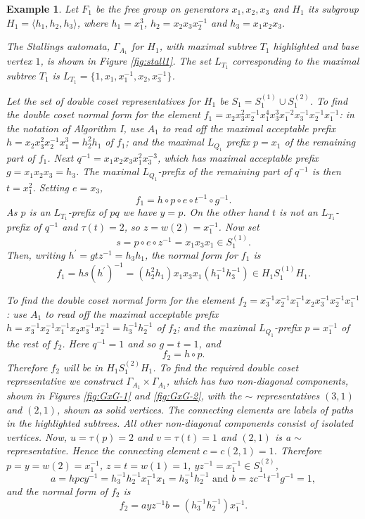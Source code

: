 \documentclass[a4paper,12pt]{article}
\newcommand{\G}{\Gamma }
\renewcommand{\t}{\tau }
\newtheorem{exam}[theorem]{Example}
\newenvironment{example}{\begin{exam} \rm}{\end{exam}}
\numberwithin{equation}{section}
\numberwithin{figure}{section}
\newcommand{\la}{\langle}
\newcommand{\ra}{\rangle}
\begin{document}
\begin{example}\label{ex:f_1}
Let $F_1$ be the free group on generators $x_1,x_2,x_3$ and $H_1$ its
subgroup $H_1=\la
h_1,h_2,h_3\ra$, where  $h_1= x_1^3$, $h_2=x_2x_3x_2^{-1}$ and
$h_3=x_1x_2x_3$.

The Stallings automata, $\G_{A_1}$ for $H_1$,
with maximal subtree $T_1$ highlighted and base vertex $1$, is shown
in Figure %
 \ref{fig:stall1}.
The set $L_{T_1}$ corresponding to the maximal subtree  $T_1$ is
 $L_{T_1}=\{1,x_1,x_1^{-1},x_2,x_3^{-1} \}$.

Let the set of double coset representatives for $H_1$ be $S_1=S_1^{(1)}
\cup S_1^{(2)}$.
To find the double coset normal form for the element $f_1 =
x_2x_3^2x_2^{-1} x_1^4x_3^3x_1^{-2}x_3^{-1}x_2^{-1}x_1^{-1}$: in
the notation of Algorithm I, use
${A_1}$ to read off the maximal acceptable prefix $h=x_2x_3^2x_2^{-1} x_1^3
=h_2^2h_1$
of $f_1$; and
the maximal $L_{Q_1}$ prefix $p=x_1$ of the remaining part of $f_1$. Next
$q^{-1}=x_1x_2x_3x_1^2x_3^{-3}$, which has maximal acceptable prefix
$g=x_1x_2x_3=h_3$. The maximal $L_{Q_1}$-prefix of the remaining part of $q^{-1}$
is then $t=x_1^2$. Setting $e=x_3$,
\[f_1=h\circ p\circ e\circ t^{-1}\circ g^{-1}.\]
As $p$ is an $L_{T_1}$-prefix of $pq$ we have $y=p$. On the other hand
$t$ is not an $L_{T_1}$-prefix of $q^{-1}$ and $\t(t)=2$, so $z=w(2)=x_1^{-1}$.
Now set
\[s=p\circ e\circ z^{-1}=x_1x_3x_1\in S_1^{(1)}.\]
Then, writing $h^\prime=gtz^{-1}=h_3h_1$, the normal form for $f_1$ is
\[f_1=hs(h^\prime)^{-1}=(h_2^{2}h_1) x_1x_3x_1(h_1^{-1}h_3^{-1})\in H_1S_1^{(1)}H_1.\]

To find the double coset normal form for the element
$f_2=x_3^{-1}x_2^{-1}x_1^{-1}x_2x_3^{-1}x_2^{-1}x_1^{-1}$: use
${A_1}$ to read off the maximal acceptable prefix
$h=x_3^{-1}x_2^{-1}x_1^{-1}x_2x_3^{-1}x_2^{-1}=h_3^{-1}h_2^{-1}$
of $f_2$;
and  the
maximal $L_{Q_1}$-prefix $p=x_1^{-1}$ of the rest of $f_2$.  Here
$q^{-1}=1$ and so $g=t=1$, and
\[f_2=h\circ p.\]
Therefore $f_2$ will be in $H_1S_1^{(2)}H_1$. To find the required
double coset representative we construct $\G_{A_1}\times
\G_{A_1}$, which has two non-diagonal components, shown in Figures
\ref{fig:GxG-1} and \ref{fig:GxG-2},
with the $\sim$ representatives $(3,1)$ and $(2,1)$,  shown as
solid vertices. The connecting elements are labels of paths in the
highlighted subtrees.  All other non-diagonal components consist
of isolated vertices. Now, $u=\t(p)=2$ and $v=\t(t)=1$ and $(2,1)$
is a $\sim$ representative. Hence the  connecting element
$c=c(2,1)=1$. Therefore $p=y=w(2)=x_1^{-1}$, $z=t=w(1)=1$,
$yz^{-1}=x_1^{-1}\in S_1^{(2)}$,
\[a=hpcy^{-1}=h_3^{-1}h_2^{-1}x_1^{-1}x_1=h_3^{-1}h_2^{-1}
\textrm{ and }
b=zc^{-1}t^{-1}g^{-1}=1,\]
and the normal form of $f_2$ is
\[f_2=a yz^{-1} b=(h_3^{-1}h_2^{-1}) x_1^{-1}.\]
\end{example}
\end{document}
